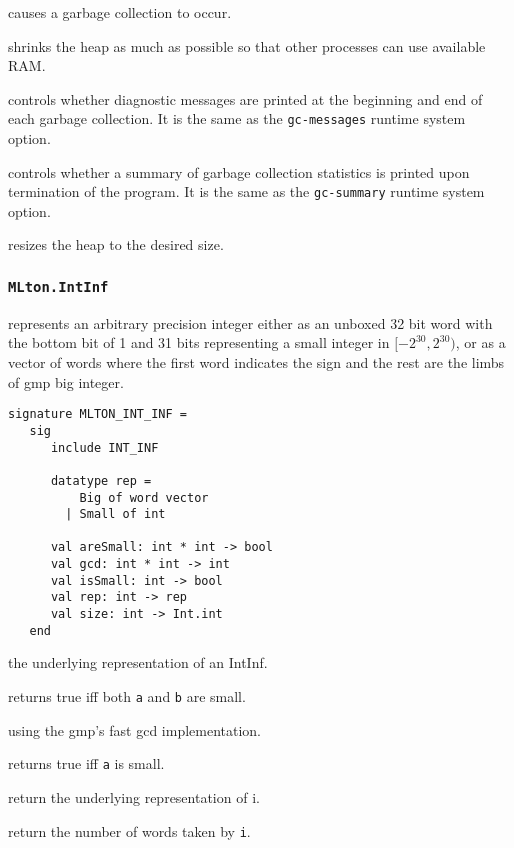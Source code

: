 \begin{description}
causes a garbage collection to occur.

shrinks the heap as much as possible so that other processes can use available
RAM.

controls whether diagnostic messages are
printed at the beginning and end of each garbage collection.  It is
the same as the {\tt gc-messages} runtime system option.

controls whether a summary of garbage
collection statistics is printed upon termination of the program.  It
is the same as the {\tt gc-summary} runtime system option.

resizes the heap to the desired size.

\end{description}
%
\subsubsection{{\tt MLton.IntInf}}

{\mlton} represents an arbitrary precision integer either as an
unboxed 32 bit word with the bottom bit of 1 and 31 bits representing
a small integer in $[-2^{30}, 2^{30})$, or as a vector of words where
the first word indicates the sign and the rest are the limbs of gmp
big integer.
\begin{verbatim}
signature MLTON_INT_INF =
   sig
      include INT_INF

      datatype rep =
          Big of word vector
        | Small of int

      val areSmall: int * int -> bool
      val gcd: int * int -> int 
      val isSmall: int -> bool
      val rep: int -> rep
      val size: int -> Int.int
   end
\end{verbatim}

\begin{description}

the underlying representation of an IntInf.

returns true iff both {\tt a} and {\tt b} are small.

using the gmp's fast gcd implementation.

returns true iff {\tt a} is small.

return the underlying representation of i.

return the number of words taken by {\tt i}.

\end{description}

